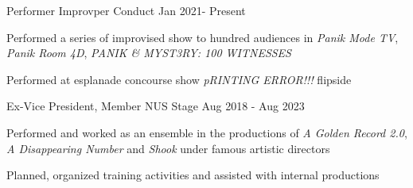

\begin{cventries}

  \cventry
  {Performer} %
  {Improvper Conduct} %
  {} %
  {Jan 2021- Present} %
  {
    \begin{cvitems} %
      \item {Performed a series of improvised show to hundred audiences in \textit{Panik Mode TV}, \textit{Panik Room 4D}, \textit{PANIK \& MYST3RY: 100 WITNESSES}}
      \item {Performed at esplanade concourse show \textit{pRINTING ERROR!!!} flipside}
    \end{cvitems}
  }

  \cventry
    {Ex-Vice President, Member} %
    {NUS Stage} %
    {} %
    {Aug 2018 - Aug 2023} %
    {
      \begin{cvitems} %
        \item {Performed and worked as an ensemble in the productions of \textit{A Golden Record 2.0}, \textit{A Disappearing Number} and \textit{Shook} under famous artistic directors}
        \item {Planned, organized training activities and assisted with internal productions}
      \end{cvitems}
    }


\end{cventries}
